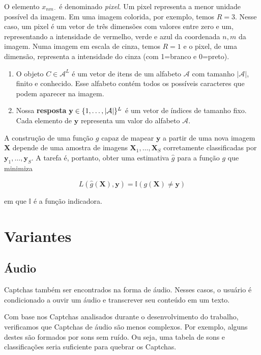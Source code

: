 \documentclass[12pt,]{report}
\begin{document}
O elemento \(x_{nm\cdot}\) é denominado \emph{pixel}. Um pixel
representa a menor unidade possível da imagem. Em uma imagem colorida,
por exemplo, temos \(R=3\). Nesse caso, um pixel é um vetor de três
dimensões com valores entre zero e um, representando a intensidade de
vermelho, verde e azul da coordenada \(n,m\) da imagem. Numa imagem em
escala de cinza, temos \(R=1\) e o pixel, de uma dimensão, representa a
intensidade do cinza (com 1=branco e 0=preto).

\begin{enumerate}
\def\labelenumi{\arabic{enumi}.}
\setcounter{enumi}{1}
\item
  O objeto \(C \in \mathcal A^L\) é um vetor de itens de um alfabeto
  \(\mathcal A\) com tamanho \(|\mathcal A|\), finito e conhecido. Esse
  alfabeto contém todos os possíveis caracteres que podem aparecer na
  imagem.
\item
  Nossa \textbf{resposta}
  \(\mathbf y \in \mathbb \{1, \dots, |\mathcal A|\}^L\) é um vetor de
  índices de tamanho fixo. Cada elemento de \(\mathbf y\) representa um
  valor do alfabeto \(\mathcal A\).
\end{enumerate}

A construção de uma função \(g\) capaz de mapear \(\mathbf y\) a partir
de uma nova imagem \(\mathbf X\) depende de uma amostra de imagens
\(\mathbf X_1, \dots, \mathbf X_S\) corretamente classificadas por
\(\mathbf y_1, \dots, \mathbf y_S\). A tarefa é, portanto, obter uma
estimativa \(\hat g\) para a função \(g\) que minimiza

\[
L(\hat g(\mathbf X), \mathbf y) = \mathbb I(g(\mathbf X) \neq \mathbf y)
\]

em que \(\mathbb I\) é a função indicadora.

\section{Variantes}\label{variantes}

\subsection{Áudio}\label{audio}

Captchas também ser encontrados na forma de áudio. Nesses casos, o
usuário é condicionado a ouvir um áudio e transcrever seu conteúdo em um
texto.

Com base nos Captchas analisados durante o desenvolvimento do trabalho,
verificamos que Captchas de áudio são menos complexos. Por exemplo,
alguns destes são formados por sons sem ruído. Ou seja, uma tabela de
sons e classificações seria suficiente para quebrar os Captchas.
\end{document}
